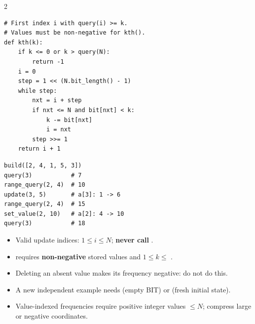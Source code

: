 \documentclass[9pt,a4paper]{extarticle}
\begin{document}
\begin{multicols}{2}
\begin{lstlisting}
# First index i with query(i) >= k.
# Values must be non-negative for kth().
def kth(k):
    if k <= 0 or k > query(N):
        return -1
    i = 0
    step = 1 << (N.bit_length() - 1)
    while step:
        nxt = i + step
        if nxt <= N and bit[nxt] < k:
            k -= bit[nxt]
            i = nxt
        step >>= 1
    return i + 1
\end{lstlisting}
\columnbreak
{}

\begin{lstlisting}
build([2, 4, 1, 5, 3])
query(3)           # 7
range_query(2, 4)  # 10
update(3, 5)       # a[3]: 1 -> 6
range_query(2, 4)  # 15
set_value(2, 10)   # a[2]: 4 -> 10
query(3)           # 18
\end{lstlisting}

{\fontsize{10.4}{12.35}\selectfont
\begin{itemize}[leftmargin=11pt,topsep=0pt,itemsep=1pt,parsep=0pt]
  \item Valid update indices: $1\le i\le N$;
  \textbf{never call} .
  \item {} requires \textbf{non-negative}
  stored values and $1\le k\le$ .
  \item Deleting an absent value makes its frequency
  negative: do not do this.
  \item A new independent example needs 
  (empty BIT) or  (fresh initial state).
  \item Value-indexed frequencies require positive integer
  values $\le N$; compress large or negative coordinates.
\end{itemize}
}


\end{multicols}
\end{document}
